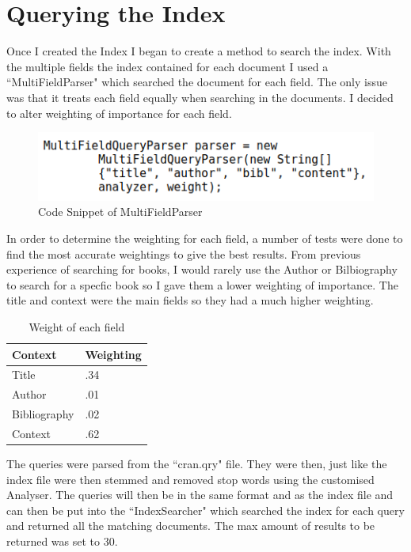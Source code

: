 \newpage
\section{Querying the Index}
Once I created the Index I began to create a method to search the index. With the multiple fields the index contained for each document I used a ``MultiFieldParser" which searched the document for each field. The only issue was that it treats each field equally when searching in the documents.  I decided to alter weighting of importance for each field. \par

	\begin{figure}[ht!]
		\begin{center}
			\includegraphics[scale=.5 ]{6} 
			\caption{Code Snippet of MultiFieldParser}
			\label{fig:1}
		\end{center}
	\end{figure} \par
  
In order to determine the weighting for each field, a number of tests were done to find the most accurate weightings to give the best results. From previous experience of searching for books, I would rarely use the Author or Bilbiography to search for a specfic book so I gave them a lower weighting of importance. The title and context were the main fields so they had a much higher weighting. \par

	\begin{table}[H]
		\centering
		\begin{tabular}{|p{2.5cm}|p{2.5cm}|}
			\hline
			\textbf{Context} 	& \textbf{Weighting} \\ \hline	
			Title 				& .34 \\ \hline
			Author 				& .01 \\ \hline
			Bibliography 		& .02 \\ \hline
			Context 			& .62 \\ \hline
		\end{tabular}
		\caption{Weight of each field}
		\label{table:weight}
	\end{table}

The queries were parsed from the ``cran.qry" file. They were then, just like the index file were then stemmed and removed stop words using the customised Analyser. The queries will then be in the same format and as the index file and can then be put into the ``IndexSearcher" which searched the index for each query and returned all the matching documents. The max amount of results to be returned was set to 30.


